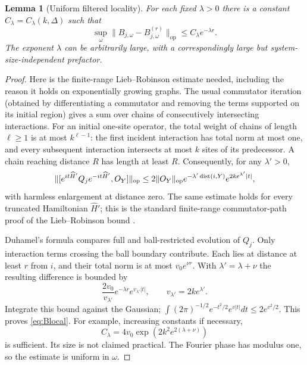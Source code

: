 \documentclass[11pt]{article}
\newtheorem{lemma}[theorem]{Lemma}
\theoremstyle{remark}\newtheorem{remark}[theorem]{Remark}
\newcommand{\op}[1]{\|#1\|_{\mathrm{op}}}
\begin{document}
\begin{lemma}[Uniform filtered locality]\label{lem:locality}
For each fixed $\lambda>0$ there is a constant $C_\lambda=C_\lambda(k,\Delta)$ such that
\begin{equation}\label{eq:Blocal}
 \sup_\omega\op{B_{j,\omega}-B_{j,\omega}^{(r)}}\le C_\lambda e^{-\lambda r}.
\end{equation}
The exponent $\lambda$ can be arbitrarily large, with a correspondingly large but system-size-independent prefactor.
\end{lemma}
\begin{proof}
Here is the finite-range Lieb--Robinson estimate needed, including the reason it holds on exponentially growing graphs. The usual commutator iteration (obtained by differentiating a commutator and removing the terms supported on its initial region) gives a sum over chains of consecutively intersecting interactions. For an initial one-site operator, the total weight of chains of length $\ell\ge1$ is at most $k^{\ell-1}$: the first incident interaction has total norm at most one, and every subsequent interaction intersects at most $k$ sites of its predecessor. A chain reaching distance $R$ has length at least $R$. Consequently, for any $\lambda'>0$,
\[
 \op{[e^{it\widehat H'}Q_j e^{-it\widehat H'},O_Y]}
 \le2\op{O_Y}e^{-\lambda'\dist(i,Y)}
 e^{2ke^{\lambda'}|t|},
\]
with harmless enlargement at distance zero. The same estimate holds for every truncated Hamiltonian $\widehat H'$; this is the standard finite-range commutator-path proof of the Lieb--Robinson bound \cite{NS}.

Duhamel's formula compares full and ball-restricted evolution of $Q_j$. Only interaction terms crossing the ball boundary contribute. Each lies at distance at least $r$ from $i$, and their total norm is at most $v_0e^{\nu r}$. With $\lambda'=\lambda+\nu$ the resulting difference is bounded by
\[
 \frac{2v_0}{v_{\lambda'}}e^{-\lambda r}e^{v_{\lambda'}|t|},
 \qquad v_{\lambda'}=2ke^{\lambda'}.
\]
Integrate this bound against the Gaussian; $\int (2\pi)^{-1/2}e^{-t^2/2}e^{v|t|}dt\le2e^{v^2/2}$. This proves \eqref{eq:Blocal}. For example, increasing constants if necessary,
\begin{equation}\label{eq:Clambda}
 C_\lambda=4v_0\exp\!\left(2k^2e^{2(\lambda+\nu)}\right)
\end{equation}
is sufficient. Its size is not claimed practical. The Fourier phase has modulus one, so the estimate is uniform in $\omega$.
\end{proof}
\end{document}
